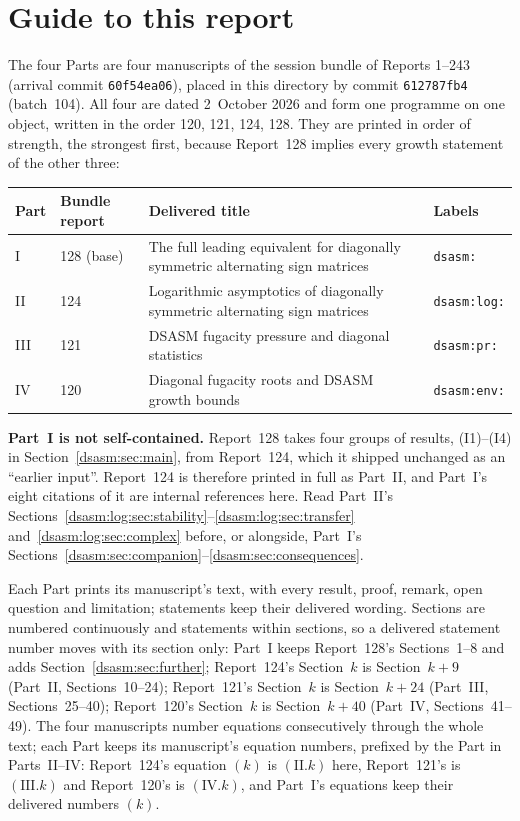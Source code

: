 \documentclass[11pt,letterpaper]{article}
\theoremstyle{remark}\newtheorem{remark}[theorem]{Remark}
\begin{document}
\hypersetup{pageanchor=true}
\newpage
\setcounter{tocdepth}{1}
{\small\setlength{\parskip}{0pt}\tableofcontents}
\newpage

\section*{Guide to this report}\label{dsasm:sec:guide}
The four Parts are four manuscripts of the session bundle of Reports 1--243 (arrival commit \texttt{60f54ea06}), placed in this directory by commit \texttt{612787fb4} (batch~104). All four are dated 2~October 2026 and form one programme on one object, written in the order 120, 121, 124, 128. They are printed in order of strength, the strongest first, because Report~128 implies every growth statement of the other three:
\begin{center}
\small
\begin{tabular}{@{}l l >{\raggedright\arraybackslash}p{} l@{}}
\toprule
Part & Bundle report & Delivered title & Labels\\
\midrule
I & 128 (base) & The full leading equivalent for diagonally symmetric alternating sign matrices & \texttt{dsasm:}\\
II & 124 & Logarithmic asymptotics of diagonally symmetric alternating sign matrices & \texttt{dsasm:log:}\\
III & 121 & DSASM fugacity pressure and diagonal statistics & \texttt{dsasm:pr:}\\
IV & 120 & Diagonal fugacity roots and DSASM growth bounds & \texttt{dsasm:env:}\\
\bottomrule
\end{tabular}
\end{center}
\textbf{Part~I is not self-contained.} Report~128 takes four groups of results, (I1)--(I4) in Section~\ref{dsasm:sec:main}, from Report~124, which it shipped unchanged as an ``earlier input''. Report~124 is therefore printed in full as Part~II, and Part~I's eight citations of it are internal references here. Read Part~II's Sections~\ref{dsasm:log:sec:stability}--\ref{dsasm:log:sec:transfer} and~\ref{dsasm:log:sec:complex} before, or alongside, Part~I's Sections~\ref{dsasm:sec:companion}--\ref{dsasm:sec:consequences}.

Each Part prints its manuscript's text, with every result, proof, remark, open question and limitation; statements keep their delivered wording. Sections are numbered continuously and statements within sections, so a delivered statement number moves with its section only: Part~I keeps Report~128's Sections~1--8 and adds Section~\ref{dsasm:sec:further}; Report~124's Section~$k$ is Section~$k+9$ (Part~II, Sections~10--24); Report~121's Section~$k$ is Section~$k+24$ (Part~III, Sections~25--40); Report~120's Section~$k$ is Section~$k+40$ (Part~IV, Sections~41--49). The four manuscripts number equations consecutively through the whole text; each Part keeps its manuscript's equation numbers, prefixed by the Part in Parts~II--IV: Report~124's equation $(k)$ is $(\mathrm{II}.k)$ here, Report~121's is $(\mathrm{III}.k)$ and Report~120's is $(\mathrm{IV}.k)$, and Part~I's equations keep their delivered numbers $(k)$.
\end{document}
